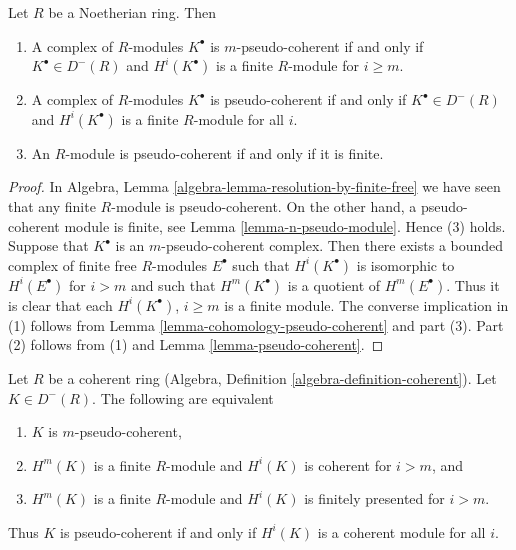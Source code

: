 \begin{lemma}
\label{lemma-Noetherian-pseudo-coherent}
Let $R$ be a Noetherian ring. Then
\begin{enumerate}
\item A complex of $R$-modules $K^\bullet$ is $m$-pseudo-coherent
if and only if $K^\bullet \in D^{-}(R)$ and
$H^i(K^\bullet)$ is a finite $R$-module for $i \geq m$.
\item A complex of $R$-modules $K^\bullet$ is pseudo-coherent
if and only if $K^\bullet \in D^{-}(R)$ and
$H^i(K^\bullet)$ is a finite $R$-module for all $i$.
\item An $R$-module is pseudo-coherent if and only if it is finite.
\end{enumerate}
\end{lemma}

\begin{proof}
In
Algebra, Lemma \ref{algebra-lemma-resolution-by-finite-free}
we have seen that any finite $R$-module is pseudo-coherent.
On the other hand, a pseudo-coherent module is finite, see
Lemma \ref{lemma-n-pseudo-module}.
Hence (3) holds. Suppose that $K^\bullet$ is an $m$-pseudo-coherent complex.
Then there exists a bounded complex of finite free $R$-modules $E^\bullet$
such that $H^i(K^\bullet)$ is isomorphic to $H^i(E^\bullet)$ for
$i > m$ and such that $H^m(K^\bullet)$ is a quotient of $H^m(E^\bullet)$.
Thus it is clear that each $H^i(K^\bullet)$, $i \geq m$ is a finite module.
The converse implication in (1) follows from
Lemma \ref{lemma-cohomology-pseudo-coherent}
and part (3).
Part (2) follows from (1) and
Lemma \ref{lemma-pseudo-coherent}.
\end{proof}

\begin{lemma}
\label{lemma-coherent-pseudo-coherent}
Let $R$ be a coherent ring
(Algebra, Definition \ref{algebra-definition-coherent}).
Let $K \in D^-(R)$. The following are equivalent
\begin{enumerate}
\item $K$ is $m$-pseudo-coherent,
\item $H^m(K)$ is a finite $R$-module and $H^i(K)$ is coherent for $i > m$, and
\item $H^m(K)$ is a finite $R$-module and
$H^i(K)$ is finitely presented for $i > m$.
\end{enumerate}
Thus $K$ is pseudo-coherent if and only if $H^i(K)$
is a coherent module for all $i$.
\end{lemma}

